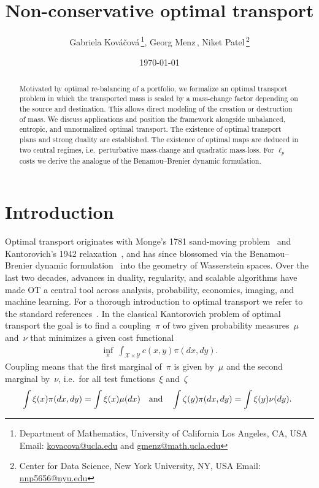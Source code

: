 \documentclass{article}
\title{Non-conservative optimal transport}
\date{\today}
\author{
  Gabriela Kov\'a\v{c}ov\'a\,\thanks{
    Department of Mathematics, University of California Los Angeles, CA, USA
    \newline \hspace*{1.45em} Email: \url{kovacova@ucla.edu} and \url{gmenz@math.ucla.edu}
  \vspace{0.5em} },
  \quad
  Georg Menz\,\protect\footnotemark[1],  
  \quad 
  Niket Patel\,\protect\footnotemark[1] \hspace{1pt}\thanks{Center for Data Science, New York University, NY, USA \newline \hspace*{1.45em} Email: \url{nnp5656@nyu.edu}}
}
\theoremstyle{definition}
\begin{document}
\maketitle


\begin{abstract}

    Motivated by optimal re-balancing of a portfolio, we formalize an optimal transport problem in which the transported mass is scaled by a  mass-change factor depending on the source and destination. This allows direct modeling of the creation or destruction of mass. We discuss applications and position the framework alongside unbalanced, entropic, and unnormalized optimal transport. The existence of optimal transport plans and strong duality are established. The existence of optimal maps are deduced in two central regimes, i.e.~perturbative mass-change and quadratic mass-loss. For $\ell_p$ costs we derive the analogue of the Benamou–Brenier dynamic formulation.
    \end{abstract}




\section{Introduction}

Optimal transport originates with Monge’s 1781 sand-moving problem~\cite{monge1781memoire} and Kantorovich’s 1942 relaxation~\cite{kantorovich1942translation}, and has since blossomed via the Benamou–Brenier dynamic formulation~\cite{benamou2000computational} into the geometry of Wasserstein spaces. Over the last two decades, advances in duality, regularity, and scalable algorithms have made OT a central tool across analysis, probability, economics, imaging, and machine learning. For a thorough introduction to optimal transport we refer to the standard references~\cite{ambrosio2008gradient,villani2008optimal,santambrogio2015otam}. In the classical Kantorovich problem of optimal transport the goal is to find a coupling~$\pi$ of two given probability measures~$\mu$ and~$\nu$ that minimizes a given cost functional
\begin{align}
\inf_{\pi}  \ \int_{\mathcal{X} \times \mathcal{Y} } c(x,y) \pi(dx,dy) .   \tag{CKP}   \label{equ:classic_katorovich_problem}
\end{align}
Coupling means that the first marginal of~$\pi$ is given by~$\mu$ and the second marginal by~$\nu$, i.e.~for all test functions~$\xi$ and~$\zeta$
\begin{align}\label{equ:marginal_condition_CKP}
\hspace{-0.2cm}
    \int \xi(x) \pi(dx, dy) = \int \xi(x)\mu(dx) \quad \mbox{and} \quad  \int \zeta(y) \pi(dx, dy) = \int \xi(y)\nu(dy).
\end{align}
\end{document}
